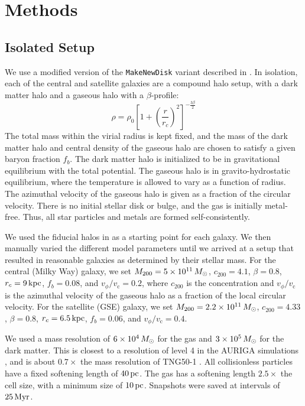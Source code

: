 \section{Methods}\label{sec:methods}
\subsection{Isolated Setup}\label{ssec:iso_setup}
We use a modified version of the \texttt{MakeNewDisk} variant described in \citet{2023MNRAS.tmp.2070B}. In isolation, each of the central and satellite galaxies are a compound halo setup, with a \citet{1990ApJ...356..359H} dark matter halo and a gaseous halo with a $\beta$-profile:
\begin{equation*}
\rho = \rho_0 \left[1 + \left(\frac{r}{r_c}\right)^2\right]^{-\frac{3\beta}{2}}
\end{equation*}
The total mass within the virial radius is kept fixed, and the mass of the dark matter halo and central density of the gaseous halo are chosen to satisfy a given baryon fraction $f_b$. The dark matter halo is initialized to be in gravitational equilibrium with the total potential. The gaseous halo is in gravito-hydrostatic equilibrium, where the temperature is allowed to vary as a function of radius. The azimuthal velocity of the gaseous halo is given as a fraction of the circular velocity. There is no initial stellar disk or bulge, and the gas is initially metal-free. Thus, all star particles and metals are formed self-consistently.

We used the fiducial halos in \citet{2021ApJ...923...92N} as a starting point for each galaxy. We then manually varied the different model parameters until we arrived at a setup that resulted in reasonable galaxies as determined by their stellar mass. For the central (Milky Way) galaxy, we set $M_{200}=5\times10^{11}\,M_{\odot}$, $c_{200}=4.1$, $\beta=0.8$, $r_c=9\,\textrm{kpc}$, $f_b=0.08$, and $v_{\phi}/v_{\textrm{c}}=0.2$, where $c_{200}$ is the concentration and $v_{\phi}/v_{\textrm{c}}$ is the azimuthal velocity of the gaseous halo as a fraction of the local circular velocity. For the satellite (GSE) galaxy, we set $M_{200}=2.2\times10^{11}\,M_{\odot}$, $c_{200}=4.33$, $\beta=0.8$, $r_c=6.5\,\textrm{kpc}$, $f_b=0.06$, and $v_{\phi}/v_{\textrm{c}}=0.4$.

We used a mass resolution of $6\times10^4\,M_{\odot}$ for the gas and $3\times10^5\,M_{\odot}$ for the dark matter. This is closest to a resolution of level 4 in the AURIGA simulations \citep{2017MNRAS.467..179G}, and is about $0.7\times$ the mass resolution of TNG50-1 \citep{2019MNRAS.490.3234N,2019MNRAS.490.3196P}. All collisionless particles have a fixed softening length of $40\,\textrm{pc}$. The gas has a softening length $2.5\times$ the cell size, with a minimum size of $10\,\textrm{pc}$. Snapshots were saved at intervals of $25\,\textrm{Myr}$.

